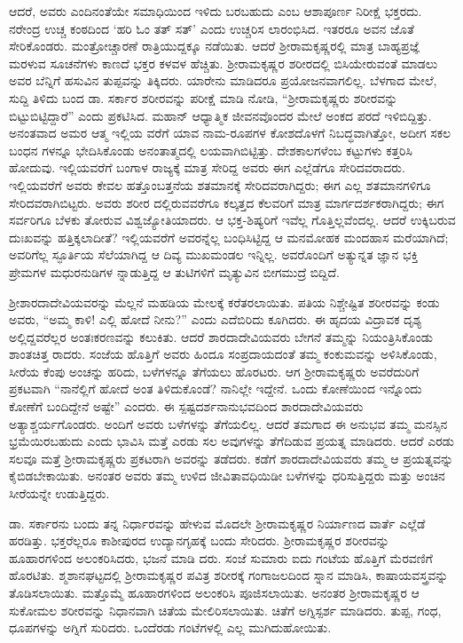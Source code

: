 ಆದರೆ, ಅವರು ಎಂದಿನಂತೆಯೇ ಸಮಾಧಿಯಿಂದ ಇಳಿದು ಬರಬಹುದು ಎಂಬ ಆಶಾಪೂರ್ಣ ನಿರೀಕ್ಷೆ ಭಕ್ತರದು. ನರೇಂದ್ರ ಉಚ್ಚ ಕಂಠದಿಂದ ‘ಹರಿ ಓಂ ತತ್ ಸತ್’ ಎಂದು ಉಚ್ಚರಿಸ ಲಾರಂಭಿಸಿದ. ಇತರರೂ ಅವನ ಜೊತೆ ಸೇರಿಕೊಂಡರು. ಮಂತ್ರೋಚ್ಚಾರಣೆ ರಾತ್ರಿಯುದ್ದಕ್ಕೂ ನಡೆಯಿತು. ಆದರೆ ಶ್ರೀರಾಮಕೃಷ್ಣರಲ್ಲಿ ಮಾತ್ರ ಬಾಹ್ಯಪ್ರಜ್ಞೆ ಮರಳುವ ಸೂಚನೆಗಳು ಕಾಣದೆ ಭಕ್ತರ ಕಳವಳ ಹೆಚ್ಚಿತು. ಶ್ರೀರಾಮಕೃಷ್ಣರ ಶರೀರದಲ್ಲಿ ಬಿಸಿಯೇರುವಂತೆ ಮಾಡಲು ಅವರ ಬೆನ್ನಿಗೆ ಹಸುವಿನ ತುಪ್ಪವನ್ನು ತಿಕ್ಕಿದರು. ಯಾರೇನು ಮಾಡಿದರೂ ಪ್ರಯೋಜನವಾಗಲಿಲ್ಲ. ಬೆಳಗಾದ ಮೇಲೆ, ಸುದ್ದಿ ತಿಳಿದು ಬಂದ ಡಾ. ಸರ್ಕಾರ ಶರೀರವನ್ನು ಪರೀಕ್ಷೆ ಮಾಡಿ ನೋಡಿ, “ಶ್ರೀರಾಮಕೃಷ್ಣರು ಶರೀರವನ್ನು ಬಿಟ್ಟುಬಿಟ್ಟಿದ್ದಾರೆ” ಎಂದು ಪ್ರಕಟಿಸಿದ. ಮಹಾನ್ ಆಧ್ಯಾತ್ಮಿಕ ಜೀವನವೊಂದರ ಮೇಲೆ ಅಂಕದ ಪರದೆ ಇಳಿಬಿದ್ದಿತ್ತು. ಅನಂತವಾದ ಅಮರ ಆತ್ಮ ಇಲ್ಲಿಯ ವರೆಗೆ ಯಾವ ನಾಮ-ರೂಪಗಳ ಕೋಶದೊಳಗೆ ನಿಬದ್ಧವಾಗಿತ್ತೋ, ಅದೀಗ ಸಕಲ ಬಂಧನ ಗಳನ್ನೂ ಭೇದಿಸಿಕೊಂಡು ಅನಂತಾತ್ಮದಲ್ಲಿ ಲಯವಾಗಿಬಿಟ್ಟಿತ್ತು. ದೇಶಕಾಲಗಳೆಂಬ ಕಟ್ಟುಗಳು ಕತ್ತರಿಸಿ ಹೋದುವು. ಇಲ್ಲಿಯವರೆಗೆ ಬಂಗಾಳ ರಾಜ್ಯಕ್ಕೆ ಮಾತ್ರ ಸೇರಿದ್ದ ಅವರು ಈಗ ಎಲ್ಲೆಡೆಗೂ ಸೇರಿದವರಾದರು. ಇಲ್ಲಿಯವರೆಗೆ ಅವರು ಕೇವಲ ಹತ್ತೊಂಬತ್ತನೆಯ ಶತಮಾನಕ್ಕೆ ಸೇರಿದವರಾಗಿದ್ದರು; ಈಗ ಎಲ್ಲ ಶತಮಾನಗಳಿಗೂ ಸೇರಿದವರಾಗಿಬಿಟ್ಟರು. ಅವರು ಶರೀರ ದಲ್ಲಿರುವವರೆಗೂ ಕಲ್ಕತ್ತದ ಕೆಲವರಿಗೆ ಮಾತ್ರ ಮಾರ್ಗದರ್ಶಕರಾಗಿದ್ದರು; ಈಗ ಸರ್ವರಿಗೂ ಬೆಳಕು ತೋರುವ ವಿಶ್ವಜ್ಯೋತಿಯಾದರು. ಆ ಭಕ್ತ-ಶಿಷ್ಯರಿಗೆ ಇವೆಲ್ಲ ಗೊತ್ತಿಲ್ಲವೆಂದಲ್ಲ. ಆದರೆ ಉಕ್ಕಿಬರುವ ದುಃಖವನ್ನು ಹತ್ತಿಕ್ಕಲಾದೀತೆ? ಇಲ್ಲಿಯವರೆಗೆ ಅವರನ್ನೆಲ್ಲ ಬಂಧಿಸಿಟ್ಟಿದ್ದ ಆ ಮನಮೋಹಕ ಮಂದಹಾಸ ಮರೆಯಾಗಿದೆ; ಅವರಿಗೆಲ್ಲ ಸ್ಫೂರ್ತಿಯ ಸೆಲೆಯಾಗಿದ್ದ ಆ ದಿವ್ಯ ಮುಖಮಂಡಲ ಇನ್ನಿಲ್ಲ. ಅವರೊಂದಿಗೆ ಅತ್ಯುನ್ನತ ಜ್ಞಾನ ಭಕ್ತಿ ಪ್ರೇಮಗಳ ಮಧುರನುಡಿಗಳ ನ್ನಾಡುತ್ತಿದ್ದ ಆ ತುಟಿಗಳಿಗೆ ಮೃತ್ಯುವಿನ ಬೀಗಮುದ್ರೆ ಬಿದ್ದಿದೆ.

ಶ್ರೀಶಾರದಾದೇವಿಯವರನ್ನು ಮೆಲ್ಲನೆ ಮಹಡಿಯ ಮೇಲಕ್ಕೆ ಕರೆತರಲಾಯಿತು. ಪತಿಯ ನಿಶ್ಚೇಷ್ಟಿತ ಶರೀರವನ್ನು ಕಂಡು ಅವರು, “ಅಮ್ಮ ಕಾಳಿ! ಎಲ್ಲಿ ಹೋದೆ ನೀನು?” ಎಂದು ಎದೆಬಿರಿದು ಕೂಗಿದರು. ಈ ಹೃದಯ ವಿದ್ರಾವಕ ದೃಶ್ಯ ಅಲ್ಲಿದ್ದವರೆಲ್ಲರ ಅಂತಃಕರಣವನ್ನು ಕಲುಕಿತು. ಆದರೆ ಶಾರದಾದೇವಿಯವರು ಬೇಗನೆ ತಮ್ಮನ್ನು ನಿಯಂತ್ರಿಸಿಕೊಂಡು ಶಾಂತಚಿತ್ತ ರಾದರು. ಸಂಜೆಯ ಹೊತ್ತಿಗೆ ಅವರು ಹಿಂದೂ ಸಂಪ್ರದಾಯದಂತೆ ತಮ್ಮ ಕಂಕುಮವನ್ನು ಅಳಿಸಿಕೊಂಡು, ಸೀರೆಯ ಕೆಂಪು ಅಂಚನ್ನು ಹರಿದು, ಬಳೆಗಳನ್ನೂ ತೆಗೆಯಲು ಹೊರಟರು. ಆಗ ಶ್ರೀರಾಮಕೃಷ್ಣರು ಅವರೆದುರಿಗೆ ಪ್ರಕಟವಾಗಿ “ನಾನೆಲ್ಲಿಗೆ ಹೋದೆ ಅಂತ ತಿಳಿದುಕೊಂಡೆ? ನಾನಿಲ್ಲೇ ಇದ್ದೇನೆ. ಒಂದು ಕೋಣೆಯಿಂದ ಇನ್ನೊಂದು ಕೋಣೆಗೆ ಬಂದಿದ್ದೇನೆ ಅಷ್ಟೇ” ಎಂದರು. ಈ ಸ್ಪಷ್ಟದರ್ಶನಾನುಭವದಿಂದ ಶಾರದಾದೇವಿಯವರು ಅತ್ಯಾಶ್ಚರ್ಯಗೊಂಡರು. ಅಂದಿಗೆ ಅವರು ಬಳೆಗಳನ್ನು ತೆಗೆಯಲಿಲ್ಲ. ಆದರೆ ತಮಗಾದ ಈ ಅನುಭವ ತಮ್ಮ ಮನಸ್ಸಿನ ಭ್ರಮೆಯಿರಬಹುದು ಎಂದು ಭಾವಿಸಿ ಮತ್ತೆ ಎರಡು ಸಲ ಅವುಗಳನ್ನು ತೆಗೆದಿಡುವ ಪ್ರಯತ್ನ ಮಾಡಿದರು. ಆದರೆ ಎರಡು ಸಲವೂ ಮತ್ತೆ ಶ್ರೀರಾಮಕೃಷ್ಣರು ಪ್ರಕಟರಾಗಿ ಅವರನ್ನು ತಡೆದರು. ಕಡೆಗೆ ಶಾರದಾದೇವಿಯವರು ತಮ್ಮ ಆ ಪ್ರಯತ್ನವನ್ನು ಕೈಬಿಡಬೇಕಾಯಿತು. ಅನಂತರ ಅವರು ತಮ್ಮ ಉಳಿದ ಜೀವಿತಾವಧಿಯಿಡೀ ಬಳೆಗಳನ್ನು ಧರಿಸುತ್ತಿದ್ದರು ಮತ್ತು ಅಂಚಿನ ಸೀರೆಯನ್ನೇ ಉಡುತ್ತಿದ್ದರು. 

ಡಾ. ಸರ್ಕಾರನು ಬಂದು ತನ್ನ ನಿರ್ಧಾರವನ್ನು ಹೇಳುವ ಮೊದಲೇ ಶ್ರೀರಾಮಕೃಷ್ಣರ ನಿರ್ಯಾಣದ ವಾರ್ತೆ ಎಲ್ಲೆಡೆ ಹರಡಿತ್ತು. ಭಕ್ತರೆಲ್ಲರೂ ಕಾಶೀಪುರದ ಉದ್ಯಾನಗೃಹಕ್ಕೆ ಬಂದು ಸೇರಿದರು. ಶ್ರೀರಾಮಕೃಷ್ಣರ ಶರೀರವನ್ನು ಹೂಹಾರಗಳಿಂದ ಅಲಂಕರಿಸಿದರು, ಭಜನೆ ಮಾಡಿ ದರು. ಸಂಜೆ ಸುಮಾರು ಐದು ಗಂಟೆಯ ಹೊತ್ತಿಗೆ ಮೆರವಣಿಗೆ ಹೊರಟಿತು. ಶ್ಮಶಾನಘಟ್ಟದಲ್ಲಿ ಶ್ರೀರಾಮಕೃಷ್ಣರ ಪವಿತ್ರ ಶರೀರಕ್ಕೆ ಗಂಗಾಜಲದಿಂದ ಸ್ನಾನ ಮಾಡಿಸಿ, ಕಾಷಾಯವಸ್ತ್ರವನ್ನು ತೊಡಿಸಲಾಯಿತು. ಮತ್ತೊಮ್ಮೆ ಹೂಹಾರಗಳಿಂದ ಅಲಂಕರಿಸಿ ಪೂಜಿಸಲಾಯಿತು. ಅನಂತರ ಶ್ರೀರಾಮಕೃಷ್ಣರ ಆ ಸುಕೋಮಲ ಶರೀರವನ್ನು ನಿಧಾನವಾಗಿ ಚಿತೆಯ ಮೇಲಿರಿಸಲಾಯಿತು. ಚಿತೆಗೆ ಅಗ್ನಿಸ್ಪರ್ಶ ಮಾಡಿದರು. ತುಪ್ಪ, ಗಂಧ, ಧೂಪಗಳನ್ನು ಅಗ್ನಿಗೆ ಸುರಿದರು. ಒಂದೆರಡು ಗಂಟೆಗಳಲ್ಲಿ ಎಲ್ಲ ಮುಗಿದುಹೋಯಿತು.

